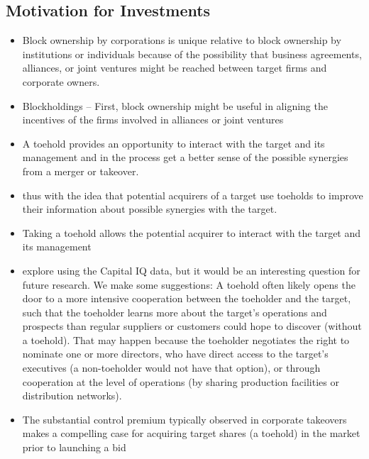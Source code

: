 \documentclass[12pt]{article}
\begin{document}
\subsection{Motivation for Investments}

    \begin{itemize}
        \item Block ownership by corporations is unique relative to block ownership by institutions or individuals because of the possibility that business agreements, alliances, or joint ventures might be reached between target firms and corporate owners. \citep{Allen2000}

        \item Blockholdings -- First, block ownership might be useful in aligning the incentives of the firms involved in alliances or joint ventures \citep{Allen2000}

        \item A toehold provides an opportunity to interact with the target and its management and in the process get a better sense of the possible synergies from a merger or takeover. \citep{Povel2014}

        \item thus with the idea that potential acquirers of a target use toeholds to improve their information about possible synergies with the target. \citep{Povel2014}

        \item Taking a toehold allows the potential acquirer to interact with the target and its management \citep{Povel2014}

        \item explore using the Capital IQ data, but it would be an interesting question for future research. We make some suggestions: A toehold often likely opens the door to a more intensive cooperation between the toeholder and the target, such that the toeholder learns more about the target's operations and prospects than regular suppliers or customers could hope to discover (without a toehold). That may happen because the toeholder negotiates the right to nominate one or more directors, who have direct access to the target's executives (a non-toeholder would not have that option), or through cooperation at the level of operations (by sharing production facilities or distribution networks). \citep{Povel2014}

        \item The substantial control premium typically observed in corporate takeovers makes a compelling case for acquiring target shares (a toehold) in the market prior to launching a bid \citep{Betton2009}


\end{itemize}
\end{document}
